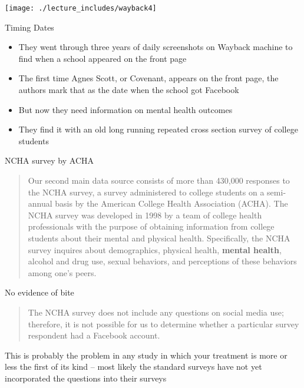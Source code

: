 \documentclass{beamer}
\begin{document}
\begin{frame}
\begin{center}
\texttt{[image: ./lecture\_includes/wayback4]}
\end{center}
\end{frame}

\begin{frame}{Timing Dates}

\begin{itemize}
\item They went through three years of daily screenshots on Wayback machine to find when a school appeared on the front page
\item The first time Agnes Scott, or Covenant, appears on the front page, the authors mark that as the date when the school got Facebook
\item But now they need information on mental health outcomes
\item They find it with an old long running repeated cross section survey of college students
\end{itemize}

\end{frame}

\begin{frame}{NCHA survey by ACHA}

\begin{quote}
Our second main data source consists of more than 430,000 responses to the NCHA survey, a survey administered to college students on a semi-annual basis by the American College Health Association (ACHA). The NCHA survey was developed in 1998 by a team of college health professionals with the purpose of obtaining information from college students about their mental and physical health. Specifically, the NCHA survey inquires about demographics, physical health, \textbf{mental health}, alcohol and drug use, sexual behaviors, and perceptions of these behaviors among one’s peers.
\end{quote}

\end{frame}

\begin{frame}{No evidence of bite}

\begin{quote}
The NCHA survey does not include any questions on social media use; therefore, it is not possible for us to determine whether a particular survey respondent had a Facebook account.
\end{quote}

\bigskip

This is probably the problem in any study in which your treatment is more or less the first of its kind -- most likely the standard surveys have not yet incorporated the questions into their surveys

\end{frame}
\end{document}

